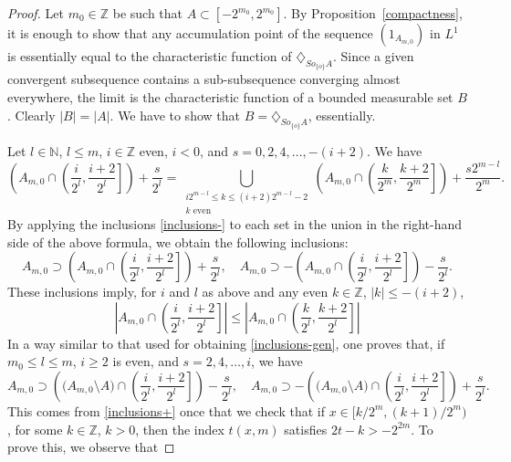 \documentclass[12pt,reqno]{amsart}
\newcommand{\N}{{\mathbb N}}
\newcommand{\Z}{{\mathbb Z}}
\newcommand{\di}{\diamondsuit}
\numberwithin{equation}{section}
\begin{document}
\begin{proof}
Let $m_0\in\Z$ be such that $A\subset[-2^{m_0}, 2^{m_0}]$. By Proposition~\ref{compactness}, it is enough to show that any accumulation point of the sequence $(1_{A_{m,0}})$ in $L^1$ is essentially equal to the characteristic function of $\di_{So_{\{o\}}A}$. Since a given convergent subsequence contains a sub-subsequence converging almost everywhere, the limit is the characteristic function of a bounded measurable set $B$. Clearly $|B|=|A|$.  We have to show that $B=\di_{So_{\{o\}}A}$, essentially.

Let $l\in\N$,  $l\leq m$, $i\in\Z$ even, $i<0$,  and $s=0,2, 4,\dots,-(i+2)$. We  have
\begin{equation*}
\left(A_{m,0}\cap\left(\frac{i}{2^l},\frac{i+2}{2^l}\right]\right) + \frac{s}{2^l}=
\bigcup_{\substack{i2^{m-l}\leq k \leq (i+2)2^{m-l}-2\\\text{$k$ even}}}
\left(A_{m,0}\cap\left(\frac{k}{2^m},\frac{k+2}{2^m}\right]\right) + \frac{s2^{m-l}}{2^m}.
\end{equation*}
By applying the inclusions \eqref{inclusions-} to each set in the union in the right-hand side of the above formula, we obtain the following inclusions:
\begin{equation}\label{inclusions-gen}
A_{m,0}\supset \left(A_{m,0}\cap\left(\frac{i}{2^l},\frac{i+2}{2^l}\right]\right) + \frac{s}{2^l}, \quad  A_{m,0}\supset-\left(A_{m,0}\cap\left(\frac{i}{2^l},\frac{i+2}{2^l}\right]\right) - \frac{s}{2^l}.
\end{equation}
These inclusions imply, for $i$ and $l$ as above and any even $k\in \Z$, $|k|\leq -(i+2)$,
\begin{equation}\label{inclusions-measure}
\left|A_{m,0}\cap\left(\frac{i}{2^l},\frac{i+2}{2^l}\right]\right|\leq \left|A_{m,0}\cap\left(\frac{k}{2^l},\frac{k+2}{2^l}\right]\right|
\end{equation}
In a way similar to that used for obtaining \eqref{inclusions-gen}, one proves that, if $m_0\leq l\leq m$,  $i\ge 2$ is even, and $s=2, 4,\dots,i$, we have
\begin{equation}\label{inclusions+gen}
A_{m,0}\supset \left(\big(A_{m,0}\setminus A\big)\cap\left(\frac{i}{2^l},\frac{i+2}{2^l}\right]\right) - \frac{s}{2^l}, \quad  A_{m,0}\supset-\left(\big(A_{m,0}\setminus A\big)\cap\left(\frac{i}{2^l},\frac{i+2}{2^l}\right]\right) + \frac{s}{2^l}.
\end{equation}
This comes from \eqref{inclusions+} once that we check that if $x\in[k/2^m, (k+1)/2^m)$,  for some $k\in\Z$, $k>0$, then the index $t(x,m)$ satisfies $2t-k>-2^{2m}$. To prove this, we observe that

\end{proof}
\end{document}
